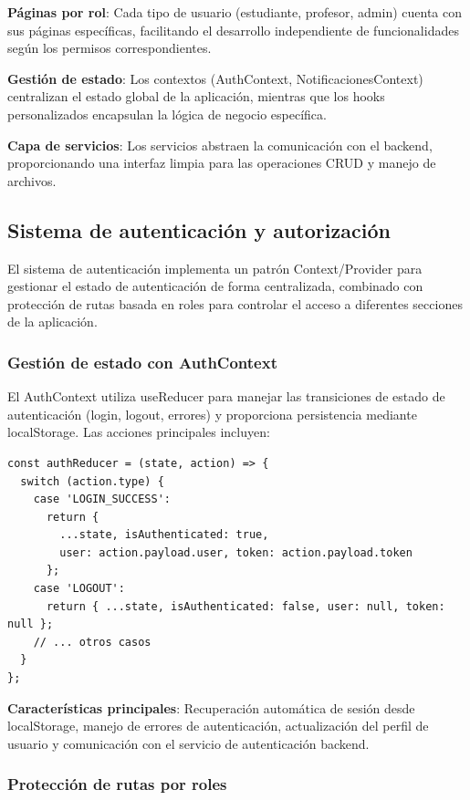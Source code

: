\documentclass[12pt,a4paper,oneside]{report}
\begin{document}
\textbf{Páginas por rol}: Cada tipo de usuario (estudiante, profesor, admin) cuenta con sus páginas específicas, facilitando el desarrollo independiente de funcionalidades según los permisos correspondientes.

\textbf{Gestión de estado}: Los contextos (AuthContext, NotificacionesContext) centralizan el estado global de la aplicación, mientras que los hooks personalizados encapsulan la lógica de negocio específica.

\textbf{Capa de servicios}: Los servicios abstraen la comunicación con el backend, proporcionando una interfaz limpia para las operaciones CRUD y manejo de archivos.

\subsection{Sistema de autenticación y autorización}\label{implementaciuxf3n-del-sistema-de-autenticaciuxf3n}

El sistema de autenticación implementa un patrón Context/Provider para gestionar el estado de autenticación de forma centralizada, combinado con protección de rutas basada en roles para controlar el acceso a diferentes secciones de la aplicación.

\subsubsection{Gestión de estado con AuthContext}\label{authcontext-y-provider}

El AuthContext utiliza useReducer para manejar las transiciones de estado de autenticación (login, logout, errores) y proporciona persistencia mediante localStorage. Las acciones principales incluyen:

\begin{lstlisting}
const authReducer = (state, action) => {
  switch (action.type) {
    case 'LOGIN_SUCCESS':
      return {
        ...state, isAuthenticated: true,
        user: action.payload.user, token: action.payload.token
      };
    case 'LOGOUT':
      return { ...state, isAuthenticated: false, user: null, token: null };
    // ... otros casos
  }
};
\end{lstlisting}

\textbf{Características principales}: Recuperación automática de sesión desde localStorage, manejo de errores de autenticación, actualización del perfil de usuario y comunicación con el servicio de autenticación backend.

\subsubsection{Protección de rutas por roles}\label{componente-protectedroute}
\end{document}
